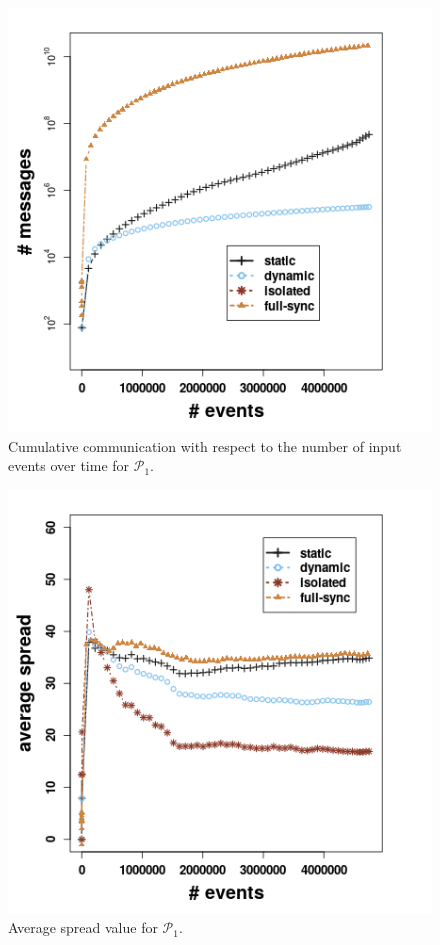 \begin{center}
	
	\begin{figure}[h]
		
		\includegraphics[width=.5\textwidth]{figures/messages_p1.png}
		
		\caption{Cumulative communication with respect to the number of input events over time for $\mathcal{P}_1$.}
		\label{fig:comm}
	\end{figure}
\end{center}




\begin{center}
	
	\begin{figure}[ht]
		
		\includegraphics[width=.5\textwidth]{figures/spread_p1.png}
		
		\caption{Average spread value for $\mathcal{P}_1$.}
		\label{fig:spread}
	\end{figure}
\end{center}

